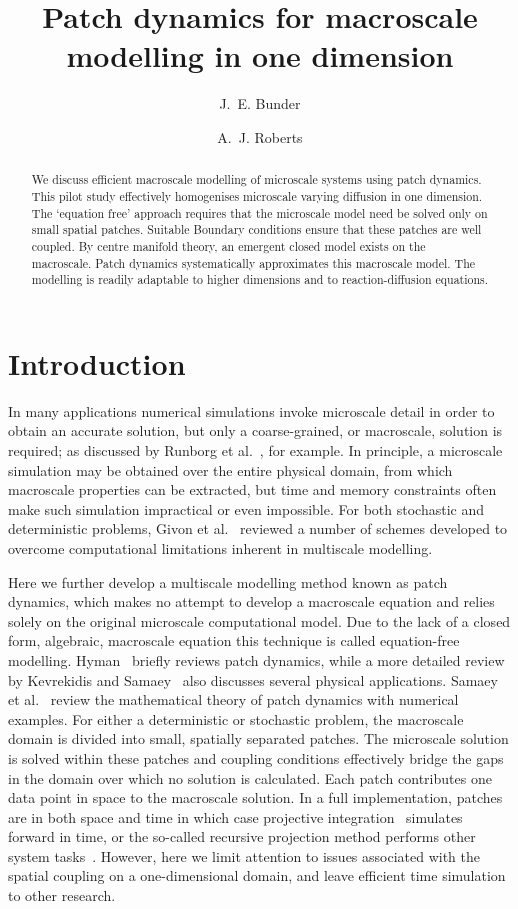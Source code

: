 \documentclass[12pt,a4paper]{article}
\title{Patch dynamics for macroscale modelling in one dimension}
\author{J.~E. Bunder}
\author{A.~J. Roberts}
\begin{document}
\maketitle

\begin{abstract}
We discuss efficient macroscale modelling of microscale systems using patch dynamics. This pilot study effectively homogenises microscale varying diffusion in one dimension. The `equation free' approach requires that the microscale model need be solved only on small spatial patches. Suitable Boundary conditions ensure that these patches are well coupled. By centre manifold theory, an emergent closed model exists on the macroscale. Patch dynamics systematically approximates this macroscale model. The modelling is readily adaptable to higher dimensions and to reaction-diffusion equations.
\end{abstract}


\section{Introduction}
\label{sec:intro}
In many applications numerical simulations invoke microscale detail in order to obtain an accurate solution, but only a coarse-grained, or macroscale, solution is required; as discussed by Runborg et al.~\cite{Runborg2002},  for example. In principle, a microscale simulation may be obtained over the entire physical domain, from which macroscale properties can be extracted, but time and memory constraints often make such simulation impractical or even impossible. For both stochastic and deterministic problems, Givon et al.~\cite{Givon04} reviewed a number of schemes developed to overcome computational limitations inherent in multiscale modelling. 

Here we further develop a multiscale modelling method known as patch dynamics, which makes no attempt to develop a macroscale equation and relies solely on the original microscale computational model.
Due to the lack of a closed form, algebraic, macroscale equation this technique is called equation-free modelling. Hyman~\cite{Hyman05} briefly reviews patch dynamics, while a more detailed review by Kevrekidis and Samaey~\cite{Kevrekidis09} also discusses several physical applications. Samaey et al.~\cite{Samaey10} review the mathematical theory of patch dynamics with numerical examples. For either a deterministic or stochastic problem, the macroscale domain is divided into small, spatially separated patches. The microscale solution is solved within these patches and coupling conditions effectively bridge the gaps in the domain over which no solution is calculated. Each patch contributes one data point in space to the macroscale solution. In a full implementation, patches are in  both space and time in which case projective integration~\cite{Samaey05} simulates forward in time, or the so-called recursive projection method performs other system tasks~\cite[e.g.]{Runborg2002, Moller2005}. However, here we limit attention to issues associated with the spatial coupling on a one-dimensional domain, and leave efficient time simulation to other research.
\end{document}
